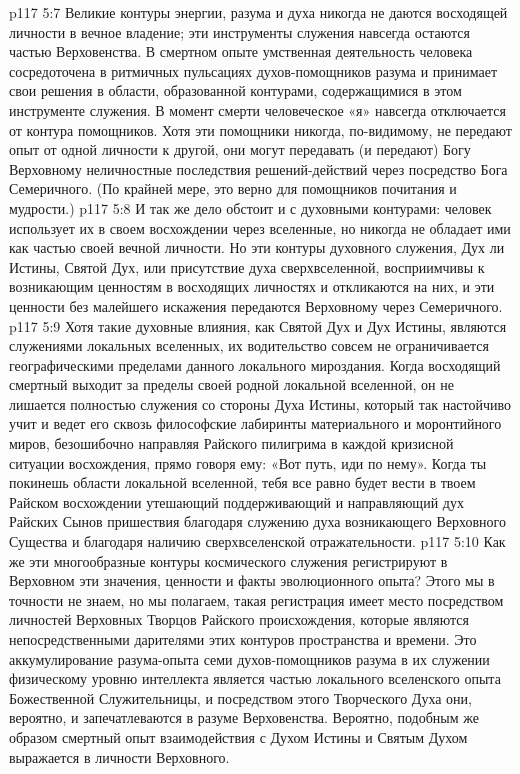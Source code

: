 \vs p117 5:7 Великие контуры энергии, разума и духа никогда не даются восходящей личности в вечное владение; эти инструменты служения навсегда остаются частью Верховенства. В смертном опыте умственная деятельность человека сосредоточена в ритмичных пульсациях духов\hyp{}помощников разума и принимает свои решения в области, образованной контурами, содержащимися в этом инструменте служения. В момент смерти человеческое «я» навсегда отключается от контура помощников. Хотя эти помощники никогда, по\hyp{}видимому, не передают опыт от одной личности к другой, они могут передавать (и передают) Богу Верховному неличностные последствия решений\hyp{}действий через посредство Бога Семеричного. (По крайней мере, это верно для помощников почитания и мудрости.)
\vs p117 5:8 И так же дело обстоит и с духовными контурами: человек использует их в своем восхождении через вселенные, но никогда не обладает ими как частью своей вечной личности. Но эти контуры духовного служения, Дух ли Истины, Святой Дух, или присутствие духа сверхвселенной, восприимчивы к возникающим ценностям в восходящих личностях и откликаются на них, и эти ценности без малейшего искажения передаются Верховному через Семеричного.
\vs p117 5:9 \pc Хотя такие духовные влияния, как Святой Дух и Дух Истины, являются служениями локальных вселенных, их водительство совсем не ограничивается географическими пределами данного локального мироздания. Когда восходящий смертный выходит за пределы своей родной локальной вселенной, он не лишается полностью служения со стороны Духа Истины, который так настойчиво учит и ведет его сквозь философские лабиринты материального и моронтийного миров, безошибочно направляя Райского пилигрима в каждой кризисной ситуации восхождения, прямо говоря ему: «Вот путь, иди по нему». Когда ты покинешь области локальной вселенной, тебя все равно будет вести в твоем Райском восхождении утешающий поддерживающий и направляющий дух Райских Сынов пришествия благодаря служению духа возникающего Верховного Существа и благодаря наличию сверхвселенской отражательности.
\vs p117 5:10 Как же эти многообразные контуры космического служения регистрируют в Верховном эти значения, ценности и факты эволюционного опыта? Этого мы в точности не знаем, но мы полагаем, такая регистрация имеет место посредством личностей Верховных Творцов Райского происхождения, которые являются непосредственными дарителями этих контуров пространства и времени. Это аккумулирование разума\hyp{}опыта семи духов\hyp{}помощников разума в их служении физическому уровню интеллекта является частью локального вселенского опыта Божественной Служительницы, и посредством этого Творческого Духа они, вероятно, и запечатлеваются в разуме Верховенства. Вероятно, подобным же образом смертный опыт взаимодействия с Духом Истины и Святым Духом выражается в личности Верховного.
